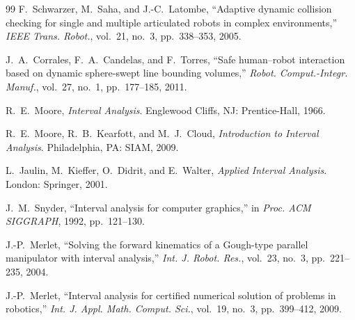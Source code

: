 \documentclass[11pt,a4paper]{article}
\begin{document}
\begin{thebibliography}{99}
F.~Schwarzer, M.~Saha, and J.-C.~Latombe,
``Adaptive dynamic collision checking for single and multiple articulated robots
in complex environments,''
\textit{IEEE Trans. Robot.}, vol.~21, no.~3, pp.~338--353, 2005.

J.~A.~Corrales, F.~A.~Candelas, and F.~Torres,
``Safe human--robot interaction based on dynamic sphere-swept line bounding volumes,''
\textit{Robot. Comput.-Integr. Manuf.}, vol.~27, no.~1, pp.~177--185, 2011.

R.~E.~Moore,
\textit{Interval Analysis}.
Englewood Cliffs, NJ: Prentice-Hall, 1966.

R.~E.~Moore, R.~B.~Kearfott, and M.~J.~Cloud,
\textit{Introduction to Interval Analysis}.
Philadelphia, PA: SIAM, 2009.

L.~Jaulin, M.~Kieffer, O.~Didrit, and E.~Walter,
\textit{Applied Interval Analysis}.
London: Springer, 2001.

J.~M.~Snyder,
``Interval analysis for computer graphics,''
in \textit{Proc. ACM SIGGRAPH}, 1992, pp.~121--130.

J.-P.~Merlet,
``Solving the forward kinematics of a Gough-type parallel manipulator with
interval analysis,''
\textit{Int. J. Robot. Res.}, vol.~23, no.~3, pp.~221--235, 2004.

J.-P.~Merlet,
``Interval analysis for certified numerical solution of problems in robotics,''
\textit{Int. J. Appl. Math. Comput. Sci.}, vol.~19, no.~3, pp.~399--412, 2009.

\end{thebibliography}
\end{document}

